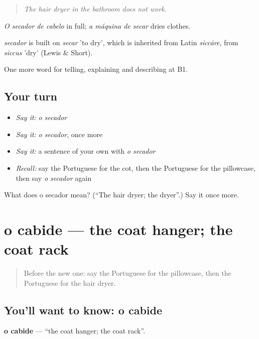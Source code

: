 \begin{quote}
\emph{The hair dryer in the bathroom does not work.}
\end{quote}

\emph{O secador de cabelo} in full; \emph{a máquina de secar} dries clothes.

\begin{cousinweb}
\emph{secador} is built on \emph{secar} 'to dry', which is inherited from Latin \emph{siccāre}, from \emph{siccus} 'dry' (Lewis \& Short).
\end{cousinweb}

\begin{grammarlens}[title={What you've built}]
One more word for telling, explaining and describing at B1.
\end{grammarlens}

\subsection*{Your turn}
\begin{itemize}
\raggedright
  \item \emph{Say it:} \emph{o secador}
  \item \emph{Say it:} \emph{o secador}, once more
  \item \emph{Say it:} a sentence of your own with \emph{o secador}
  \item \emph{Recall:} say the Portuguese for the cot, then the Portuguese for the pillowcase, then say \emph{o secador} again
\end{itemize}

\begin{tcolorbox}[breakable,colback=teal!4,colframe=teal!35!black,title={Before you move on}]
What does o secador mean? (\textquotedblleft{}The hair dryer; the dryer\textquotedblright{}.) Say it once more.
\end{tcolorbox}
\section[o cabide]{o cabide — the coat hanger; the coat rack}

\label{lesson:PT-C429-cabide}



\begin{quote}
Before the new one: say the Portuguese for the pillowcase, then the Portuguese for the hair dryer.
\end{quote}

\subsection*{You'll want to know: o cabide}
\textbf{o cabide} — \textquotedblleft{}the coat hanger; the coat rack\textquotedblright{}.

